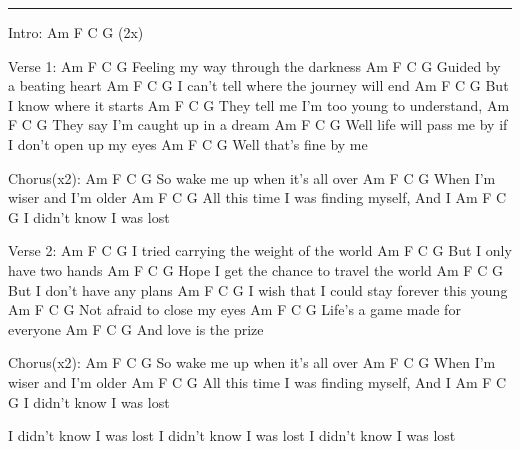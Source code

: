 \noindent\rule{\columnwidth}{1pt}

\begin{multicols}{2}
\begin{lstsong}
Intro:
Am F C G (2x)

Verse 1:
Am       F              C           G
Feeling my way through the darkness
Am       F              C           G
Guided by a beating heart 
Am       F              C           G
I can't tell where the journey will end 
Am       F              C           G
But I know where it starts 
Am       F              C           G
They tell me I'm too young to understand,
Am       F              C           G
They say I'm caught up in a dream 
Am       F              C           G
Well life will pass me by if I don't open up my eyes
Am          F       C    G
Well that's fine by me

Chorus(x2):
            Am       F      C    G
So wake me up when it's all over 
            Am       F      C    G
When I'm wiser and I'm older 
            Am       F      C          G
All this time I was finding myself, And I 
Am       F          C    G
I didn't know I was lost

Verse 2:
Am      F            C             G
I tried carrying the weight of the world
Am    F             C    G
But I only have two hands 
Am     F                 C               G
Hope I get the chance to travel the world
Am    F              C    G
But I don't have any plans 
Am     F            C                 G
I wish that I could stay forever this young
Am  F                  C   G
Not afraid to close my eyes 
Am       F              C      G
Life's a game made for everyone
Am  F           C    G
And love is the prize

Chorus(x2):
            Am       F      C    G
So wake me up when it's all over 
            Am       F      C    G
When I'm wiser and I'm older 
            Am       F      C          G
All this time I was finding myself, And I 
Am       F          C    G
I didn't know I was lost

I didn't know I was lost
I didn't know I was lost
I didn't know I was lost
\end{lstsong}
\end{multicols}
\newpage

